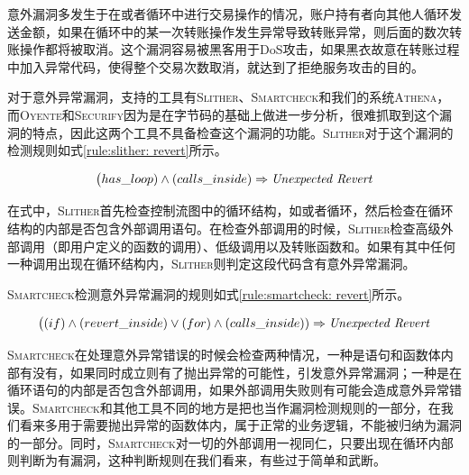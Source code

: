 意外漏洞多发生于在或者循环中进行交易操作的情况，账户持有者向其他人循环发送金额，如果在循环中的某一次转账操作发生异常导致转账异常，则后面的数次转账操作都将被取消。这个漏洞容易被黑客用于DoS攻击，如果黑衣故意在转账过程中加入异常代码，使得整个交易次数取消，就达到了拒绝服务攻击的目的。

对于意外异常漏洞，支持的工具有\textsc{Slither}、\textsc{Smartcheck}和我们的系统\textsc{Athena}，而\textsc{Oyente}和\textsc{Securify}因为是在字节码的基础上做进一步分析，很难抓取到这个漏洞的特点，因此这两个工具不具备检查这个漏洞的功能。\textsc{Slither}对于这个漏洞的检测规则如式\ref{rule:slither: revert}所示。
\begin{mdframed}[
	linewidth = 1pt,
	innertopmargin = -5pt,
	innerbottommargin = 3pt,
	outerlinewidth = 1pt
	]
    \small
	\begin{equation} \label{rule:slither: revert}
    \big (has\_loop) \wedge (calls\_inside) \Rightarrow \text{\emph{Unexpected Revert}}
	\end{equation}
\end{mdframed}

在式中，\textsc{Slither}首先检查控制流图中的循环结构，如或者循环，然后检查在循环结构的内部是否包含外部调用语句。在检查外部调用的时候，\textsc{Slither}检查高级外部调用（即用户定义的函数的调用）、低级调用以及转账函数和。如果有其中任何一种调用出现在循环结构内，\textsc{Slither}则判定这段代码含有意外异常漏洞。

\textsc{Smartcheck}检测意外异常漏洞的规则如式\ref{rule:smartcheck: revert}所示。
\begin{mdframed}[
	linewidth = 1pt,
	innertopmargin = -5pt,
	innerbottommargin = 3pt,
	outerlinewidth = 1pt
	]
    \small
	\begin{equation} \label{rule:smartcheck: revert}
    \big ((if) \wedge (revert\_inside) \vee (for) \wedge (calls\_inside)) \Rightarrow \text{\emph{Unexpected Revert}}
	\end{equation}
\end{mdframed}
\textsc{Smartcheck}在处理意外异常错误的时候会检查两种情况，一种是语句和函数体内部有没有，如果同时成立则有了抛出异常的可能性，引发意外异常漏洞；一种是在循环语句的内部是否包含外部调用，如果外部调用失败则有可能会造成意外异常错误。\textsc{Smartcheck}和其他工具不同的地方是把也当作漏洞检测规则的一部分，在我们看来多用于需要抛出异常的函数体内，属于正常的业务逻辑，不能被归纳为漏洞的一部分。同时，\textsc{Smartcheck}对一切的外部调用一视同仁，只要出现在循环内部则判断为有漏洞，这种判断规则在我们看来，有些过于简单和武断。

